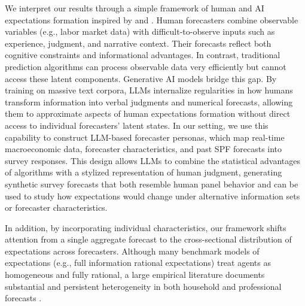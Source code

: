 \documentclass[11pt,letterpaper]{scrartcl}
\begin{document}
We interpret our results through a simple framework of human and AI expectations formation inspired by \citet{mullainathan2017machine} and \citet{agrawal2018prediction}. Human forecasters combine observable variables (e.g., labor market data) with difficult-to-observe inputs such as experience, judgment, and narrative context. Their forecasts reflect both cognitive constraints and informational advantages. In contrast, traditional prediction algorithms can process observable data very efficiently but cannot access these latent components. Generative AI models bridge this gap. By training on massive text corpora, LLMs internalize regularities in how humans transform information into verbal judgments and numerical forecasts, allowing them to approximate aspects of human expectations formation without direct access to individual forecasters' latent states. In our setting, we use this capability to construct LLM-based forecaster personas, which map real-time macroeconomic data, forecaster characteristics, and past SPF forecasts into survey responses. This design allows LLMs to combine the statistical advantages of algorithms with a stylized representation of human judgment, generating synthetic survey forecasts that both resemble human panel behavior and can be used to study how expectations would change under alternative information sets or forecaster characteristics.

In addition, by incorporating individual characteristics, our framework shifts attention from a single aggregate forecast to the cross-sectional distribution of expectations across forecasters. Although many benchmark models of expectations (e.g., full information rational expectations) treat agents as homogeneous and fully rational, a large empirical literature documents substantial and persistent heterogeneity in both household and professional forecasts \citep[e.g.,][among many others]{mankiw2002sticky, mankiw2003, coibion2015information, manzan2011differential, gabaix2020behavioral, andre2022, huang2022macroeconomic, benchimol2022expert, stark2013spf}. 
\end{document}
